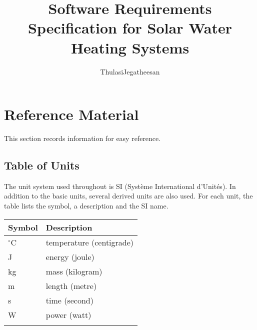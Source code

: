 \documentclass[12pt]{article}
\title{Software Requirements Specification for Solar Water Heating Systems}
\author{ThulasiJegatheesan}
\begin{document}
\maketitle
\tableofcontents
\newpage
\section{Reference Material}
\label{Sec:RefMat}
This section records information for easy reference.
\subsection{Table of Units}
\label{Sec:ToU}
The unit system used throughout is SI (Système International d'Unités). In addition to the basic units, several derived units are also used. For each unit, the table lists the symbol, a description and the SI name.
\begin{longtable*}{l l}
\toprule
Symbol & Description
\\
\midrule
${}^{\circ}$C & temperature (centigrade)
\\
J & energy (joule)
\\
kg & mass (kilogram)
\\
m & length (metre)
\\
s & time (second)
\\
W & power (watt)
\\
\bottomrule
\label{Table:ToU}
\end{longtable*}
\end{document}
